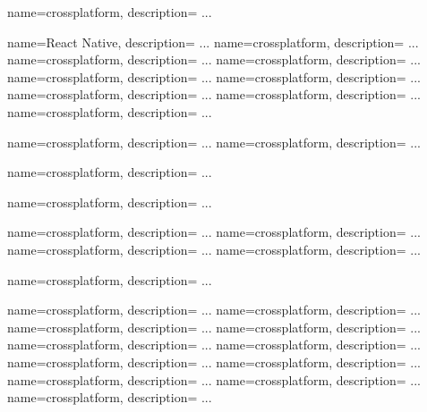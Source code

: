 
 {
  name=crossplatform,
  description={
		...
	}
}

 {
  name=React Native,
  description={
		...
	}
}
 {
  name=crossplatform,
  description={
		...
	}
}
 {
  name=crossplatform,
  description={
		...
	}
}
 {
  name=crossplatform,
  description={
		...
	}
}
 {
  name=crossplatform,
  description={
		...
	}
}
 {
  name=crossplatform,
  description={
		...
	}
}
 {
  name=crossplatform,
  description={
		...
	}
}
 {
  name=crossplatform,
  description={
		...
	}
}
 {
  name=crossplatform,
  description={
		...
	}
}

 {
  name=crossplatform,
  description={
		...
	}
}
 {
  name=crossplatform,
  description={
		...
	}
}

 {
  name=crossplatform,
  description={
		...
	}
}

 {
  name=crossplatform,
  description={
		...
	}
}

 {
  name=crossplatform,
  description={
		...
	}
}
 {
  name=crossplatform,
  description={
		...
	}
}
 {
  name=crossplatform,
  description={
		...
	}
}
 {
  name=crossplatform,
  description={
		...
	}
}

 {
  name=crossplatform,
  description={
		...
	}
}

 {
  name=crossplatform,
  description={
		...
	}
}
 {
  name=crossplatform,
  description={
		...
	}
}
 {
  name=crossplatform,
  description={
		...
	}
}
 {
  name=crossplatform,
  description={
		...
	}
}
 {
  name=crossplatform,
  description={
		...
	}
}
 {
  name=crossplatform,
  description={
		...
	}
}
 {
  name=crossplatform,
  description={
		...
	}
}
 {
  name=crossplatform,
  description={
		...
	}
}
 {
  name=crossplatform,
  description={
		...
	}
}
 {
  name=crossplatform,
  description={
		...
	}
}
 {
  name=crossplatform,
  description={
		...
	}
}

